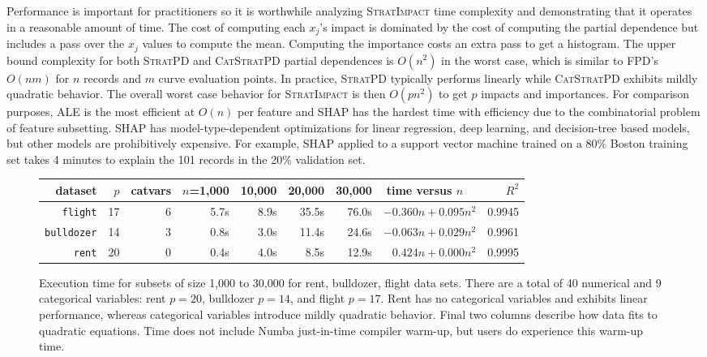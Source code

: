 \documentclass[11pt]{article}
\newcommand{\todo}[1]{{{\small\color{red}{[#1]}}}}
\newcommand{\simp}{\fontfamily{cmr}\textsc{\small StratImpact}}
\newcommand{\spd}{\fontfamily{cmr}\textsc{\small StratPD}}
\newcommand{\cspd}{\fontfamily{cmr}\textsc{\small CatStratPD}}
\begin{document}
Performance is important for practitioners so it is worthwhile analyzing \simp{} time complexity and demonstrating that it operates in a reasonable amount of time.  The cost of computing each $x_j$'s impact is dominated by the cost of computing the partial dependence but includes a pass over the $x_j$ values to compute the mean. Computing the importance costs an extra pass to get a histogram. The upper bound  complexity for both \spd{} and \cspd{} partial dependences is $O(n^2)$ in the worst case, which is  similar to FPD's $O(nm)$ for $n$ records and $m$ curve evaluation points.  In practice, \spd{} typically performs linearly while \cspd{} exhibits mildly quadratic behavior.  The overall worst case behavior for \simp{} is then $O(p n^2)$ to get $p$ impacts and importances.   For comparison purposes, ALE is the most efficient at $O(n)$ per feature and SHAP has the hardest time with efficiency due to the combinatorial problem of feature subsetting. SHAP has model-type-dependent optimizations for linear regression, deep learning, and decision-tree based models, but other models are prohibitively expensive. For example, SHAP applied to a support vector machine trained on a 80\% Boston training set takes 4 minutes to explain the 101 records in the 20\% validation set.

\begin{figure}\small
\centering
\begin{tabular}{r r r r r r r r r}
{\bf dataset} & $p$ & catvars & {\small $n$=1,000} & {\small 10,000} & {\small 20,000} & {\small 30,000} & time versus $n$~~ & $R^2$\\
\hline
{\tt\small flight} & 17 & 6 & 5.7s & 8.9s & 35.5s & 76.0s & {\small $-0.360 n + 0.095 n^2$} & {\small 0.9945}\\
{\tt\small bulldozer} & 14 & 3 & 0.8s & 3.0s & 11.4s & 24.6s & {\small $-0.063 n + 0.029 n^2$} & {\small 0.9961}\\
{\tt\small rent} & 20 & 0 & 0.4s & 4.0s & 8.5s & 12.9s & {\small $0.424 n + 0.000 n^2$} & {\small 0.9995}\\
\end{tabular}
\vspace{-3mm}
\caption{\small  Execution time for subsets of size 1,000 to 30,000 for rent, bulldozer, flight data sets.  There are a total of 40 numerical and 9 categorical variables: rent $p=20$, bulldozer $p=14$, and flight $p=17$. 
Rent has no categorical variables and exhibits linear performance, whereas categorical variables introduce mildly quadratic behavior. Final two columns describe how data fits to quadratic equations. Time does not include Numba just-in-time compiler warm-up, but users do experience this warm-up time. \todo{Table not Fig}}
\label{fig:timing}
\end{figure}
\end{document}
